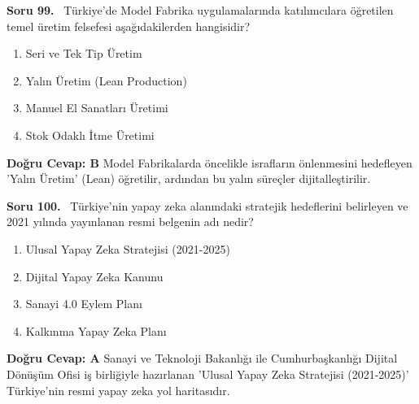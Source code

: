 \documentclass[11pt,a4paper,openany]{book}
\begin{document}
\needspace{5cm}
\vspace{8pt}
\noindent\textbf{\large\sffamily Soru 99.} \ Türkiye'de Model Fabrika uygulamalarında katılımcılara öğretilen temel üretim felsefesi aşağıdakilerden hangisidir?
\begin{enumerate}[label=\Alph*), leftmargin=25pt, topsep=4pt, itemsep=2pt]
    \item Seri ve Tek Tip Üretim
    \item Yalın Üretim (Lean Production)
    \item Manuel El Sanatları Üretimi
    \item Stok Odaklı İtme Üretimi
\end{enumerate}
\vspace{4pt}
\begin{tcolorbox}[title=Cevap ve Açıklama, colback=gray!3!white, colframe=primarycolor!90!black, arc=2mm, fonttitle=\bfseries\sffamily, top=6pt, bottom=6pt]
    \textbf{Doğru Cevap: B}
    \vspace{2pt}
    Model Fabrikalarda öncelikle israfların önlenmesini hedefleyen 'Yalın Üretim' (Lean) öğretilir, ardından bu yalın süreçler dijitalleştirilir.
\end{tcolorbox}
\vspace{10pt}

\needspace{5cm}
\vspace{8pt}
\noindent\textbf{\large\sffamily Soru 100.} \ Türkiye'nin yapay zeka alanındaki stratejik hedeflerini belirleyen ve 2021 yılında yayınlanan resmi belgenin adı nedir?
\begin{enumerate}[label=\Alph*), leftmargin=25pt, topsep=4pt, itemsep=2pt]
    \item Ulusal Yapay Zeka Stratejisi (2021-2025)
    \item Dijital Yapay Zeka Kanunu
    \item Sanayi 4.0 Eylem Planı
    \item Kalkınma Yapay Zeka Planı
\end{enumerate}
\vspace{4pt}
\begin{tcolorbox}[title=Cevap ve Açıklama, colback=gray!3!white, colframe=primarycolor!90!black, arc=2mm, fonttitle=\bfseries\sffamily, top=6pt, bottom=6pt]
    \textbf{Doğru Cevap: A}
    \vspace{2pt}
    Sanayi ve Teknoloji Bakanlığı ile Cumhurbaşkanlığı Dijital Dönüşüm Ofisi iş birliğiyle hazırlanan 'Ulusal Yapay Zeka Stratejisi (2021-2025)' Türkiye'nin resmi yapay zeka yol haritasıdır.
\end{tcolorbox}
\vspace{10pt}
\end{document}
